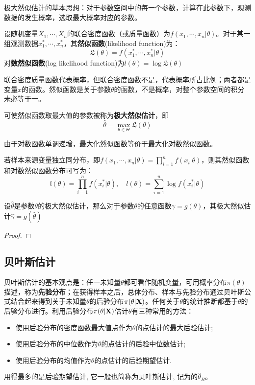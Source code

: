 极大然似估计的基本思想：对于参数空间中的每一个参数，计算在此参数下，观测数据的发生概率，选取最大概率对应的参数。

\begin{definition}[然似函数]
    设随机变量$X_1,\cdots ,X_n$的联合密度函数（或质量函数）为$f(x_1,\cdots ,x_n|\theta)$。对于某一组观测数据$x_1^* ,\cdots ,x_n^*$，其\textbf{然似函数}(likelihood function)为：
    \[ \mathfrak{L}(\theta) = f(x_1^* ,\cdots ,x_n^*|\theta) \]
    对\textbf{数然似函数}(log likelihood function)为$l(\theta)=\log\mathfrak{L}(\theta)$
\end{definition}
\begin{remark}
    联合密度质量函数代表概率，但联合密度函数不是，代表概率所占比例；两者都是变量$x$的函数。然似函数是关于参数$\theta$的函数，不是概率，对整个参数空间的积分未必等于一。
\end{remark}

\begin{definition}[极大然似估计]
    可使然似函数取最大值的参数被称为\textbf{极大然似估计}，即
    \[ \hat{\theta}=\max_{\theta \in \Theta}\mathfrak{L}(\theta) \]
\end{definition}
\begin{remark}
    由于对数函数单调递增，最大化然似函数等价于最大化对数然似函数。
\end{remark}

若样本来源变量独立同分布，即$f(x_1,\cdots ,x_n|\theta)=\prod_{i=1}^nf(x_i|\theta)$，则其然似函数和对数然似函数分布可写为：
\[ \mathfrak{l}(\theta) = \prod_{i=1}^nf(x_i^*|\theta), \quad l(\theta) = \sum_{i=1}^n \log f(x_i^*|\theta) \]

\begin{proposition}[极大然似估计的不变性]
    设$\hat{\theta}$是参数$\theta$的极大然似估计，那么对于参数$\theta$的任意函数$\gamma = g(\theta)$，其极大然似估计$\hat{\gamma}=g(\hat{\theta})$
\end{proposition}
\begin{proof}
\end{proof}

\subsection{贝叶斯估计}

贝叶斯估计的基本观点是：任一未知量$\theta$都可看作随机变量，可用概率分布$\pi(\theta)$描述，称为\textbf{先验分布}；在获得样本之后，总体分布、样本与先验分布通过贝叶斯公式结合起来得到关于未知量$\theta$的后验分布$\pi(\theta | \bf{X})$。任何关于$\theta$的统计推断都基于$\theta$的后验分布进行。利用后验分布$\pi(\theta|\bf{X})$估计$\theta$有三种常用的方法：
\begin{itemize}
    \item 使用后验分布的密度函数最大值点作为$\theta$的点估计的最大后验估计;
    \item 使用后验分布的中位数作为$\theta$的点估计的后验中位数估计;
    \item 使用后验分布的均值作为$\theta$的点估计的后验期望估计.
\end{itemize}
用得最多的是后验期望估计, 它一般也简称为贝叶斯估计, 记为的$\hat{\theta}_B$。

